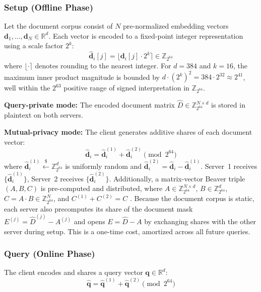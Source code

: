 \documentclass[conference]{IEEEtran}
\newcommand{\Z}{\mathbb{Z}}
\newcommand{\R}{\mathbb{R}}
\newcommand{\query}{\mathbf{q}}
\newcommand{\doc}{\mathbf{d}}
\begin{document}
\subsubsection{Setup (Offline Phase)}
Let the document corpus consist of $N$ pre-normalized embedding vectors
$\doc_1, \dots, \doc_N \in \R^d$. Each vector is encoded to a fixed-point
integer representation using a scale factor $2^k$:
\begin{equation}
    \hat{\doc}_i[j] = \lfloor \doc_i[j] \cdot 2^k \rceil \in \Z_{2^{64}}
    \label{eq:encoding}
\end{equation}
where $\lfloor \cdot \rceil$ denotes rounding to the nearest integer. For
$d = 384$ and $k = 16$, the maximum inner product magnitude is bounded by
$d \cdot (2^k)^2 = 384 \cdot 2^{32} \approx 2^{41}$, well within the
$2^{63}$ positive range of signed interpretation in $\Z_{2^{64}}$.

\textbf{Query-private mode:} The encoded document matrix
$\hat{D} \in \Z_{2^{64}}^{N \times d}$ is stored in plaintext on both
servers.

\textbf{Mutual-privacy mode:} The client generates additive shares of each
document vector:
\begin{equation}
    \hat{\doc}_i = \hat{\doc}_i^{(1)} + \hat{\doc}_i^{(2)} \pmod{2^{64}}
    \label{eq:doc_sharing}
\end{equation}
where $\hat{\doc}_i^{(1)} \xleftarrow{\$} \Z_{2^{64}}^d$ is uniformly random
and $\hat{\doc}_i^{(2)} = \hat{\doc}_i - \hat{\doc}_i^{(1)}$. Server~1
receives $\{\hat{\doc}_i^{(1)}\}$, Server~2 receives $\{\hat{\doc}_i^{(2)}\}$.
Additionally, a matrix-vector Beaver triple $(A, B, C)$ is pre-computed and
distributed, where $A \in \Z_{2^{64}}^{N \times d}$,
$B \in \Z_{2^{64}}^{d}$, $C = A \cdot B \in \Z_{2^{64}}^{N}$, and
$C^{(1)} + C^{(2)} = C$ \cite{beaver1991triples}.
Because the document corpus is static, each server also precomputes its
share of the document mask $E^{(j)} = \hat{D}^{(j)} - A^{(j)}$ and
opens $E = \hat{D} - A$ by exchanging shares with the other server
during setup. This is a one-time cost, amortized across all future queries.

\subsubsection{Query (Online Phase)}
The client encodes and shares a query vector $\query \in \R^d$:
\begin{equation}
    \hat{\query} = \hat{\query}^{(1)} + \hat{\query}^{(2)} \pmod{2^{64}}
    \label{eq:query_sharing}
\end{equation}
\end{document}
